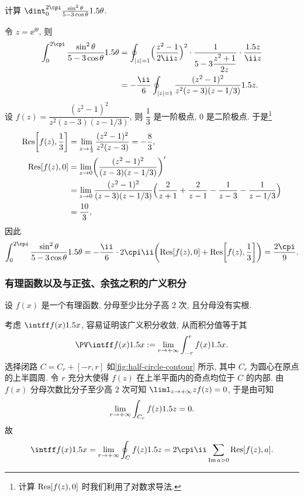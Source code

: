 \begin{example}
  计算 $\dint_0^{2\cpi}\frac{\sin^2\theta}{5-3\cos\theta}\d\theta$.
\end{example}

\begin{solution}
  令 $z=\ee^{\ii \theta}$, 则
  \begin{align*}
     \int_0^{2\cpi}\frac{\sin^2\theta}{5-3\cos\theta}\d\theta&
    =\oint_{|z|=1}\Bigl(\frac{z^2-1}{2\ii z}\Bigr)^2\cdot
      \frac1{5-3\dfrac{z^2+1}{2z}}\cdot\frac{\d z}{\ii z}\\&
    =-\frac\ii6\oint_{|z|=1}\frac{(z^2-1)^2}{z^2(z-3)(z-1/3)}\d z.
  \end{align*}
  设 $f(z)=\dfrac{(z^2-1)^2}{z^2(z-3)(z-1/3)}$, 则 $\dfrac13$ 是一阶极点, $0$ 是二阶极点.
  于是\footnote{
    计算 ${\mathrm{Res}}[f(z),0]$ 时我们利用了对数求导法.
  }
  \begin{align*}
     {\mathrm{Res}}\biggl[f(z),\frac13\biggr]&
    =\lim_{z\rightarrow \frac13}\frac{(z^2-1)^2}{z^2(z-3)}
    =-\frac83,\\
     {\mathrm{Res}}[f(z),0]&
    =\lim_{z\rightarrow 0}\biggl(\frac{(z^2-1)^2}{(z-3)(z-1/3)}\biggr)'\\&
    =\lim_{z\rightarrow 0}\frac{(z^2-1)^2}{(z-3)(z-1/3)}
      \Bigl(\frac2{z+1}+\frac2{z-1}-\frac1{z-3}-\frac1{z-1/3}\Bigr)\\&
    =\frac{10}3,
  \end{align*}
  因此
  \[
     \int_0^{2\cpi}\frac{\sin^2\theta}{5-3\cos\theta}\d\theta
    =-\frac\ii6\cdot 2\cpi\ii\biggl(\Res[f(z),0]+\Res\biggl[f(z),\frac13\biggr]\biggr)
    =\frac{2\cpi}9.
  \]
\end{solution}


\subsubsection{有理函数以及与正弦、余弦之积的广义积分}
\label{sssec:integral-rational-and-sin-cos}

设 $f(x)$ 是一个有理函数, 分母至少比分子高 $2$ 次, 且分母没有实根.

\smallskip
考虑 $\intff f(x)\d x$, 容易证明该广义积分收敛, 从而积分值等于其
\[
  \PV \intff f(x)\d x:=\lim_{r\ra+\infty}\int_{-r}^rf(x)\d x.
\]
选择闭路 $C=C_r+[-r,r]$ 如\ref{fig:half-circle-contour} 所示, 其中 $C_r$ 为圆心在原点的上半圆周.
令 $r$ 充分大使得 $f(z)$ 在上半平面内的奇点均位于 $C$ 的内部.
由 $f(x)$ 分母次数比分子至少高 $2$ 次可知 $\liml_{z\ra+\infty} zf(z)=0$, 于是由\thmSA 可知
\[
  \lim_{r\rightarrow +\infty} \int_{C_r} f(z)1.5 z=0.
\]
故
\[
   \intff f(x)\d x
  =\lim_{r\ra +\infty} \oint_C f(z)\d z
  =2\cpi\ii \sum_{\Im a>0} \Res[f(z),a].
\]

